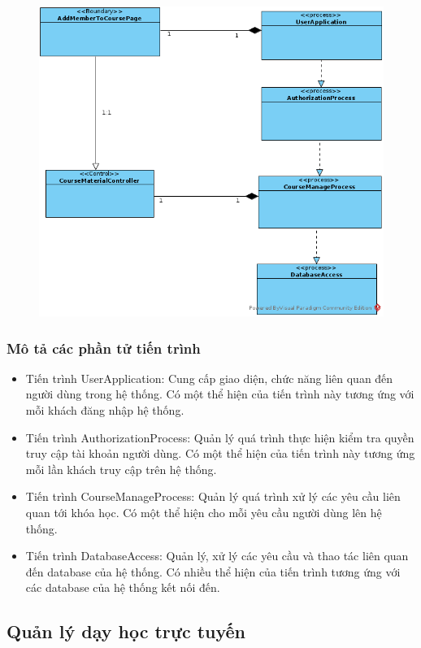 \documentclass[./../main_file.tex]{subfiles}
\begin{document}
\begin{figure}[H]
	\centering
	\includegraphics[width=\linewidth]{./images/pv_add_course_member.png}
\end{figure}

\subsubsection{Mô tả các phần tử tiến trình}
\begin{itemize}
	\item Tiến trình UserApplication: Cung cấp giao diện, chức năng liên quan đến người dùng trong hệ thống. Có một thể hiện của tiến trình này tương ứng với mỗi khách đăng nhập hệ thống.
	\item Tiến trình AuthorizationProcess: Quản lý quá trình thực hiện kiểm tra quyền truy cập tài khoản người dùng.
	Có một thể hiện của tiến trình này tương ứng mỗi lần khách truy cập trên hệ thống.
\item Tiến trình CourseManageProcess: Quản lý quá trình xử lý các yêu cầu liên quan tới khóa học.
	Có một thể hiện cho mỗi yêu cầu người dùng lên hệ thống.
	\item Tiến trình DatabaseAccess: Quản lý, xử lý các yêu cầu và thao tác liên quan đến database của hệ thống. Có nhiều thể hiện của tiến trình tương ứng với các database của hệ thống kết nối đến.
\end{itemize}

\subsection{Quản lý dạy học trực tuyến}
\end{document}
